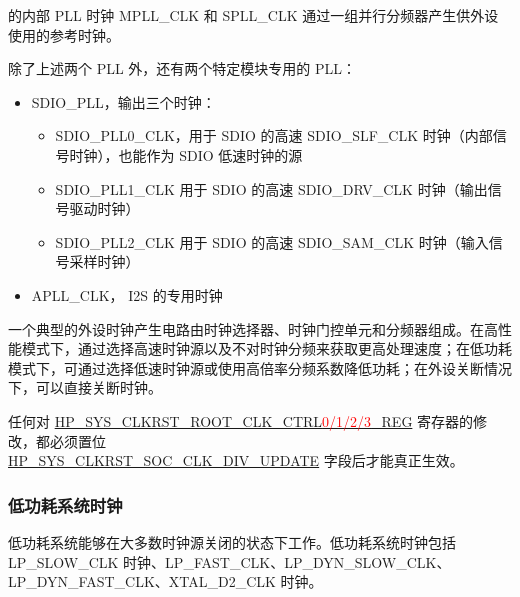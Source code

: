 \documentclass[main\_\_CN.tex]{subfiles}
\begin{document}
\chipname{} 的内部 PLL 时钟 MPLL\_CLK 和 SPLL\_CLK 通过一组并行分频器产生供外设使用的参考时钟。

除了上述两个 PLL 外，还有两个特定模块专用的 PLL：
\begin{itemize}
    \item SDIO\_PLL，输出三个时钟：
        \begin{itemize}
            \item SDIO\_PLL0\_CLK，用于 SDIO 的高速 SDIO\_SLF\_CLK 时钟（内部信号时钟），也能作为 SDIO 低速时钟的源
            \item SDIO\_PLL1\_CLK 用于 SDIO 的高速 SDIO\_DRV\_CLK 时钟（输出信号驱动时钟）
            \item SDIO\_PLL2\_CLK 用于 SDIO 的高速 SDIO\_SAM\_CLK 时钟（输入信号采样时钟）
        \end{itemize}
    \item APLL\_CLK， I2S 的专用时钟
\end{itemize}

一个典型的外设时钟产生电路由时钟选择器、时钟门控单元和分频器组成。在高性能模式下，通过选择高速时钟源以及不对时钟分频来获取更高处理速度；在低功耗模式下，可通过选择低速时钟源或使用高倍率分频系数降低功耗；在外设关断情况下，可以直接关断时钟。

\begin{tiplisting}
任何对 \hyperref[regdesc:HPSYSCLKRSTROOTCLKCTRL0REG]{HP\_SYS\_CLKRST\_ROOT\_CLK\_CTRL\textcolor{red}{0/1/2/3}\_REG} 寄存器的修改，都必须置位
\\ \hyperref[fielddesc:HPSYSCLKRSTSOCCLKDIVUPDATE]{HP\_SYS\_CLKRST\_SOC\_CLK\_DIV\_UPDATE} 字段后才能真正生效。
\end{tiplisting}


\subsubsection{低功耗系统时钟}

低功耗系统能够在大多数时钟源关闭的状态下工作。低功耗系统时钟包括 LP\_SLOW\_CLK 时钟、LP\_FAST\_CLK、LP\_DYN\_SLOW\_CLK、LP\_DYN\_FAST\_CLK、XTAL\_D2\_CLK 时钟。
\end{document}
